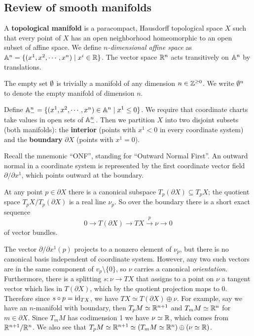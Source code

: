 \subsection{Review of smooth manifolds}
\begin{definition}[]
    A \textbf{topological manifold} is a paracompact, Hausdorff topological space $X$ such that every point of $X$ has an open neighborhood homeomorphic to an open subset of affine space. We define $n$\emph{-dimensional affine space} as $\mathbb{A}^n = \{(x^1, x^2, \cdots ,x^n ) \mid  x^i  \in \mathbb{R}\} $. The vector space $\mathbb{R}^n $ acts transitively on $\mathbb{A}^n $ by translations.
\end{definition}
\begin{definition}[]
    The empty set $\emptyset$ is trivially a manifold of any dimension $n \in \mathbb{Z}^{\geq 0}$. We write $\emptyset^n $ to denote the empty manifold of dimension $n$.
\end{definition}
\begin{definition}[]
    Define $\mathbb{A}_-^n = \{(x^1, x^2 ,\cdots ,x^n ) \in \mathbb{A}^n  \mid x^1 \leq 0\} $. We require that coordinate charts take values in open sets of $\mathbb{A}_-^n $. Then we partition $X$ into two disjoint subsets (both manifolds): the \textbf{interior} (points with $x^1 < 0$ in every coordinate system) and the \textbf{boundary} $\partial X$ (points with $x^1=0$).
\end{definition}
\begin{remark}
    Recall the mnemonic ``ONF'', standing for ``Outward Normal First''. An outward normal in a coordinate system is represented by the first coordinate vector field $\partial  /\partial  x^1$, which points outward at the boundary.
\end{remark}
\begin{definition}[]
    At any point $p \in \partial X$ there is a canonical subspace $T_p(\partial  X) \subseteq T_pX$; the quotient space $T_pX / T_p(\partial X)$ is a real line $\nu_p$. So over the boundary there is a short exact sequence \[
        0 \to T(\partial X) \to TX \xrightarrow p \nu \to 0
    \] of vector bundles. 
\end{definition}The vector $\partial  / \partial x^1(p)$ projects to a nonzero element of $\nu_p$, but there is no canonical basis independent of coordinate system. However, any two such vectors are in the same component of $v_p \setminus \{0\} $, so $\nu$ carries a canonical \emph{orientation}. Furthermore, there is a splitting $s \colon \nu \to TX$ that assigns to a point on $\nu$ a tangent vector which lies in $T(\partial X)$, which by the quotient projection maps to 0. Therefore since $s \circ p=\operatorname{id}_{TX}$, we have $TX \simeq T(\partial X)\oplus \nu$. For example, say we have an $n$-manifold with boundary, then $T_pM \simeq \mathbb{R}^{n+1}$ and $T_mM\simeq \mathbb{R}^n $ for $m \in \partial X$. Since $T_mM$ has codimension 1 we have $\nu\simeq  \mathbb{R}$, which comes from $\mathbb{R}^{n+1}/ \mathbb{R}^n $. We also see that $T_pM \simeq \mathbb{R}^{n+1}\simeq (T_mM\simeq \mathbb{R}^n ) \oplus (\nu \simeq \mathbb{R})$.

